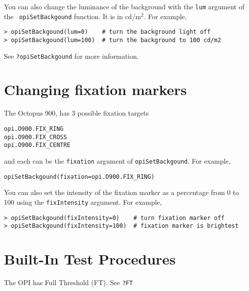 \documentclass{article}
\begin{document}
You can also change the luminance of the background with the {\tt lum} argument of the {\tt
opiSetBackgound} function. It is in cd/m$^2$.
For example,
\begin{verbatim}
> opiSetBackgound(lum=0)    # turn the background light off
> opiSetBackgound(lum=100)  # turn the background to 100 cd/m2
\end{verbatim}
See {\tt ?opiSetBackgound} for more information.

\section{Changing fixation markers}

The Octopus 900, has 3 possible fixation targets
\begin{verbatim}
opi.O900.FIX_RING
opi.O900.FIX_CROSS
opi.O900.FIX_CENTRE
\end{verbatim}
and each can be the {\tt fixation} argument of {\tt opiSetBackgound}. For example, 
\begin{verbatim}
opiSetBackgound(fixation=opi.O900.FIX_RING)
\end{verbatim}

You can also set the intensity of the fixation marker as a percentage from 0 to 100 using the
{\tt fixIntensity} argument. 
For example,
\begin{verbatim}
> opiSetBackgound(fixIntensity=0)    # turn fixation marker off
> opiSetBackgound(fixIntensity=100)  # fixation marker is brightest
\end{verbatim}

\section{Built-In Test Procedures}

The OPI has Full Threshold (FT).
See {\tt ?FT}


\end{document}
